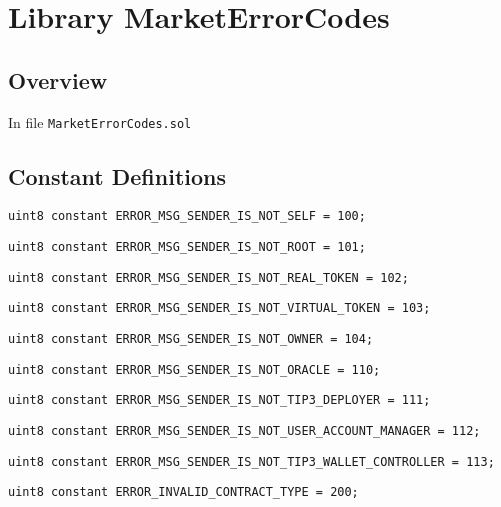 
\chapter{Library MarketErrorCodes}

\minitoc

\section{Overview}


In file {\tt MarketErrorCodes.sol}

\section{Constant Definitions}


\begin{lstlisting}[firstnumber=4]
    uint8 constant ERROR_MSG_SENDER_IS_NOT_SELF = 100;
\end{lstlisting}

\begin{lstlisting}[firstnumber=5]
    uint8 constant ERROR_MSG_SENDER_IS_NOT_ROOT = 101;
\end{lstlisting}

\begin{lstlisting}[firstnumber=6]
    uint8 constant ERROR_MSG_SENDER_IS_NOT_REAL_TOKEN = 102;
\end{lstlisting}

\begin{lstlisting}[firstnumber=7]
    uint8 constant ERROR_MSG_SENDER_IS_NOT_VIRTUAL_TOKEN = 103;
\end{lstlisting}

\begin{lstlisting}[firstnumber=8]
    uint8 constant ERROR_MSG_SENDER_IS_NOT_OWNER = 104;
\end{lstlisting}

\begin{lstlisting}[firstnumber=9]
    uint8 constant ERROR_MSG_SENDER_IS_NOT_ORACLE = 110;
\end{lstlisting}

\begin{lstlisting}[firstnumber=10]
    uint8 constant ERROR_MSG_SENDER_IS_NOT_TIP3_DEPLOYER = 111;
\end{lstlisting}

\begin{lstlisting}[firstnumber=11]
    uint8 constant ERROR_MSG_SENDER_IS_NOT_USER_ACCOUNT_MANAGER = 112;
\end{lstlisting}

\begin{lstlisting}[firstnumber=12]
    uint8 constant ERROR_MSG_SENDER_IS_NOT_TIP3_WALLET_CONTROLLER = 113;
\end{lstlisting}

\begin{lstlisting}[firstnumber=13]
    uint8 constant ERROR_INVALID_CONTRACT_TYPE = 200;
\end{lstlisting}
